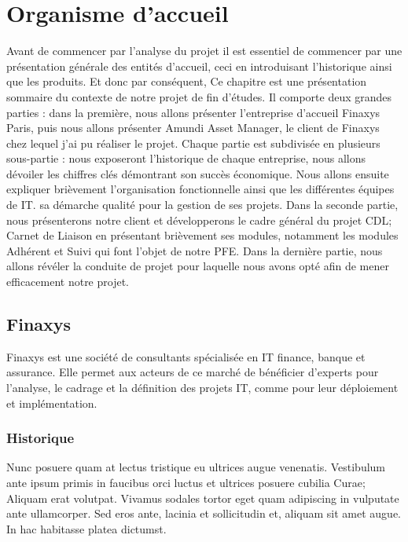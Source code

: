 
\chapter{Organisme d’accueil} %

\label{Chapter01} %

\par
Avant de commencer par l’analyse du projet il est essentiel de commencer par une présentation générale des entités d’accueil, ceci en introduisant l'historique ainsi que les produits. Et donc par conséquent, Ce chapitre est une présentation sommaire du contexte de notre projet de fin d’études. Il comporte deux grandes parties : dans la première, nous allons présenter l’entreprise d’accueil Finaxys Paris, puis nous allons présenter Amundi Asset Manager, le client de Finaxys chez lequel j'ai pu réaliser le projet.
Chaque partie est subdivisée en plusieurs sous-partie : nous exposeront l'historique de chaque entreprise, nous allons dévoiler les chiffres clés démontrant son succès économique. Nous allons ensuite expliquer brièvement l'organisation fonctionnelle ainsi que les différentes équipes de IT. sa démarche qualité pour la gestion de ses projets. Dans la seconde partie, nous présenterons notre client et développerons le cadre général du projet CDL; Carnet de Liaison en présentant brièvement ses modules, notamment les modules Adhérent et Suivi qui font l’objet de notre PFE. Dans la dernière partie, nous allons révéler la conduite de projet pour laquelle nous avons opté afin de mener efficacement notre projet.


\section{Finaxys}
\par
Finaxys est une société de consultants spécialisée en IT finance, banque et assurance. Elle permet aux acteurs de ce marché de bénéficier d’experts pour l’analyse, le cadrage et la définition des projets IT, comme pour leur déploiement et implémentation.
\subsection{Historique}

Nunc posuere quam at lectus tristique eu ultrices augue venenatis. Vestibulum ante ipsum primis in faucibus orci luctus et ultrices posuere cubilia Curae; Aliquam erat volutpat. Vivamus sodales tortor eget quam adipiscing in vulputate ante ullamcorper. Sed eros ante, lacinia et sollicitudin et, aliquam sit amet augue. In hac habitasse platea dictumst.

